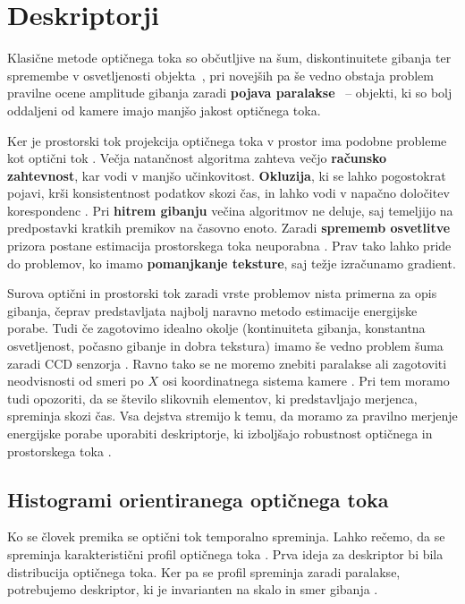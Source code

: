 \section{Deskriptorji}
Klasične metode optičnega toka so občutljive na šum, diskontinuitete gibanja ter spremembe v osvetljenosti objekta~\cite{brox2011large}, pri novejših pa še vedno obstaja problem pravilne ocene amplitude gibanja zaradi \textbf{pojava paralakse}~\cite{xu2012scale} -- objekti, ki so bolj oddaljeni od kamere imajo manjšo jakost optičnega toka. 


Ker je prostorski tok projekcija optičnega toka v prostor ima podobne probleme kot optični tok \cite{yan2016scene}. Večja natančnost algoritma zahteva večjo \textbf{računsko zahtevnost}, kar vodi v manjšo učinkovitost. \textbf{Okluzija}, ki se lahko pogostokrat pojavi, krši konsistentnost podatkov skozi čas, in lahko vodi v napačno določitev korespondenc \cite{yan2016scene}. Pri \textbf{hitrem gibanju} večina algoritmov ne deluje, saj temeljijo na predpostavki kratkih premikov na časovno enoto. Zaradi \textbf{sprememb osvetlitve} prizora postane estimacija prostorskega toka neuporabna \cite{yan2016scene}. Prav tako lahko pride do problemov, ko imamo \textbf{pomanjkanje teksture}, saj težje izračunamo gradient.

Surova optični in prostorski tok zaradi vrste problemov nista primerna za opis gibanja, čeprav predstavljata najbolj naravno metodo estimacije energijske porabe. Tudi če zagotovimo idealno okolje (kontinuiteta gibanja, konstantna osvetljenost, počasno gibanje in dobra tekstura) imamo še vedno problem šuma zaradi CCD senzorja \cite{wedel2011stereo}. Ravno tako se ne moremo znebiti paralakse ali zagotoviti neodvisnosti od smeri po $X$ osi koordinatnega sistema kamere \cite{chaudhry2009histograms}. Pri tem moramo tudi opozoriti, da se število slikovnih elementov, ki predstavljajo merjenca, spreminja skozi čas. Vsa dejstva stremijo k temu, da moramo za pravilno merjenje energijske porabe uporabiti deskriptorje, ki izboljšajo robustnost optičnega in prostorskega toka \cite{chaudhry2009histograms}. 







\subsection{Histogrami orientiranega optičnega toka}\label{sec:hoof}
Ko se človek premika se optični tok temporalno spreminja. Lahko rečemo, da se spreminja karakteristični profil optičnega toka \cite{chaudhry2009histograms}. Prva ideja za deskriptor bi bila distribucija optičnega toka. Ker pa se profil spreminja zaradi paralakse, potrebujemo deskriptor, ki je invarianten na skalo in smer gibanja \cite{chaudhry2009histograms}.

